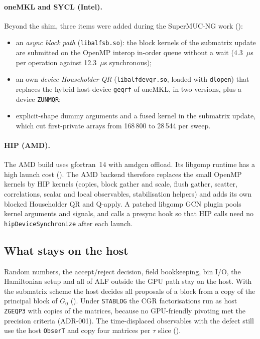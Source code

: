 \paragraph{oneMKL and SYCL (Intel).} Beyond the shim, three items were added during the SuperMUC-NG work ():
\begin{itemize}
\item an \emph{async block path} (\texttt{libalfsb.so}): the block kernels of the submatrix update are submitted on the OpenMP interop in-order queue without a wait (4.3~$\mu$s per operation against 12.3~$\mu$s synchronous);
\item an own \emph{device Householder QR} (\texttt{libalfdevqr.so}, loaded with \texttt{dlopen}) that replaces the hybrid host-device \texttt{geqrf} of oneMKL, in two versions, plus a device \texttt{ZUNMQR};
\item explicit-shape dummy arguments and a fused kernel in the submatrix update, which cut first-private arrays from 168\,800 to 28\,544 per sweep.
\end{itemize}

\paragraph{HIP (AMD).} The AMD build uses gfortran~14 with amdgcn offload. Its libgomp runtime has a high launch cost (). The AMD backend therefore replaces the small OpenMP kernels by HIP kernels (copies, block gather and scale, flush gather, scatter, correlations, scalar and local observables, stabilisation helpers) and adds its own blocked Householder QR and Q-apply. A patched libgomp GCN plugin pools kernel arguments and signals, and calls a presync hook so that HIP calls need no \texttt{hipDeviceSynchronize} after each launch.

\subsection{What stays on the host}

Random numbers, the accept/reject decision, field bookkeeping, bin I/O, the Hamiltonian setup and all of ALF outside the GPU path stay on the host. With the submatrix scheme the host decides all proposals of a block from a copy of the principal block of $G_0$ (). Under \texttt{STABLOG} the CGR factorisations run as host \texttt{ZGEQP3} with copies of the matrices, because no GPU-friendly pivoting met the precision criteria (ADR-001). The time-displaced observables with the defect still use the host \texttt{ObserT} and copy four matrices per $\tau$ slice ().


